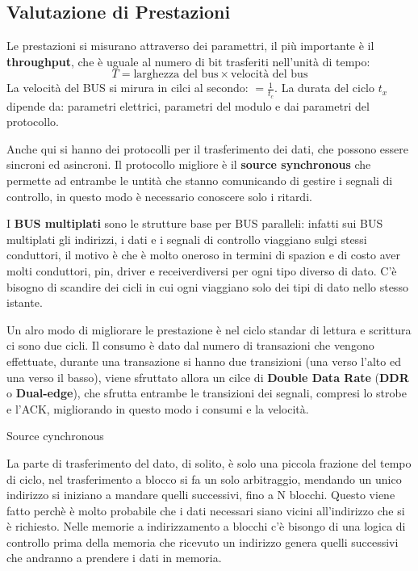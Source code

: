 \documentclass[12pt]{article}
\begin{document}
\subsection{Valutazione di Prestazioni}
Le prestazioni si misurano attraverso dei paramettri, il pi\`u importante \`e il \textbf{throughput}, che \`e uguale al numero di bit trasferiti nell'unit\`a di tempo:
\[ T = \text{larghezza del bus} \times \text{velocit\`a del bus} \]
La velocit\`a del BUS si mirura in cilci al secondo: $ = \frac{1}{t_c} $. La durata del ciclo $t_x$ dipende da: parametri elettrici, parametri del modulo e dai parametri del protocollo.

Anche qui si hanno dei protocolli per il trasferimento dei dati, che possono essere sincroni ed asincroni. Il protocollo migliore \`e il \textbf{source synchronous} che permette ad entrambe le untit\`a che stanno comunicando di gestire i segnali di controllo, in questo modo \`e necessario conoscere solo i ritardi.

I \textbf{BUS multiplati} sono le strutture base per BUS paralleli: infatti sui BUS multiplati gli indirizzi, i dati e i segnali di controllo viaggiano sulgi stessi conduttori, il motivo \`e che \`e molto oneroso in termini di spazion e di costo aver molti conduttori, pin, driver e receiverdiversi per ogni tipo diverso di dato. C'\`e bisogno di scandire dei cicli in cui ogni viaggiano solo dei tipi di dato nello stesso istante.

Un alro modo di migliorare le prestazione \`e nel ciclo standar di lettura e scrittura ci sono due cicli. Il consumo \`e dato dal numero di transazioni che vengono effettuate, durante una transazione si hanno due transizioni (una verso l'alto ed una verso il basso), viene sfruttato allora un cilce di \textbf{Double Data Rate} (\textbf{DDR} o \textbf{Dual-edge}), che sfrutta entrambe le transizioni dei segnali, compresi lo strobe e l'ACK, migliorando in questo modo i consumi e la velocit\`a.

Source cynchronous

La parte di trasferimento del dato, di solito, \`e solo una piccola frazione del tempo di ciclo, nel trasferimento a blocco si fa un solo arbitraggio, mendando un unico indirizzo si iniziano a mandare quelli successivi, fino a N blocchi. Questo viene fatto perch\`e \`e molto probabile che i dati necessari siano vicini all'indirizzo che si \`e richiesto. Nelle memorie a indirizzamento a blocchi c'\`e bisongo di una logica di controllo prima della memoria che ricevuto un indirizzo genera quelli successivi che andranno a prendere i dati in memoria.
\end{document}

